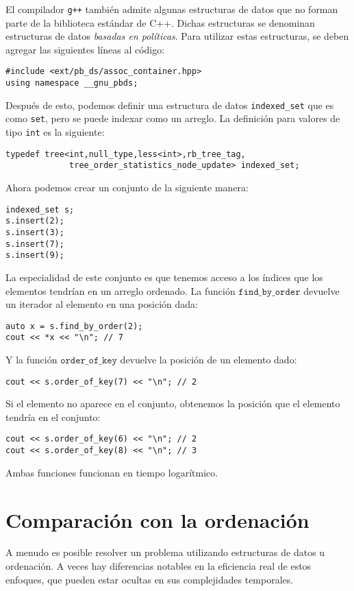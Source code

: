El compilador \texttt{g++} también admite
algunas estructuras de datos que no forman parte
de la biblioteca estándar de C++.
Dichas estructuras se denominan estructuras de datos \emph{basadas en políticas}.
Para utilizar estas estructuras, se deben
agregar las siguientes líneas al código:
\begin{lstlisting}
#include <ext/pb_ds/assoc_container.hpp>
using namespace __gnu_pbds; 
\end{lstlisting}
Después de esto, podemos definir una estructura de datos \texttt{indexed\_set} que
es como \texttt{set}, pero se puede indexar como un arreglo.
La definición para valores de tipo \texttt{int} es la siguiente:
\begin{lstlisting}
typedef tree<int,null_type,less<int>,rb_tree_tag,
             tree_order_statistics_node_update> indexed_set; 
\end{lstlisting}
Ahora podemos crear un conjunto de la siguiente manera:
\begin{lstlisting}
indexed_set s;
s.insert(2);
s.insert(3);
s.insert(7);
s.insert(9);
\end{lstlisting}
La especialidad de este conjunto es que tenemos acceso a
los índices que los elementos tendrían en un arreglo ordenado.
La función $\texttt{find\_by\_order}$ devuelve
un iterador al elemento en una posición dada:
\begin{lstlisting}
auto x = s.find_by_order(2);
cout << *x << "\n"; // 7
\end{lstlisting}
Y la función $\texttt{order\_of\_key}$
devuelve la posición de un elemento dado:
\begin{lstlisting}
cout << s.order_of_key(7) << "\n"; // 2
\end{lstlisting}
Si el elemento no aparece en el conjunto,
obtenemos la posición que el elemento tendría
en el conjunto:
\begin{lstlisting}
cout << s.order_of_key(6) << "\n"; // 2
cout << s.order_of_key(8) << "\n"; // 3
\end{lstlisting}
Ambas funciones funcionan en tiempo logarítmico.

\section{Comparación con la ordenación}

A menudo es posible resolver un problema
utilizando estructuras de datos u ordenación.
A veces hay diferencias notables
en la eficiencia real de estos enfoques,
que pueden estar ocultas en sus complejidades temporales.

